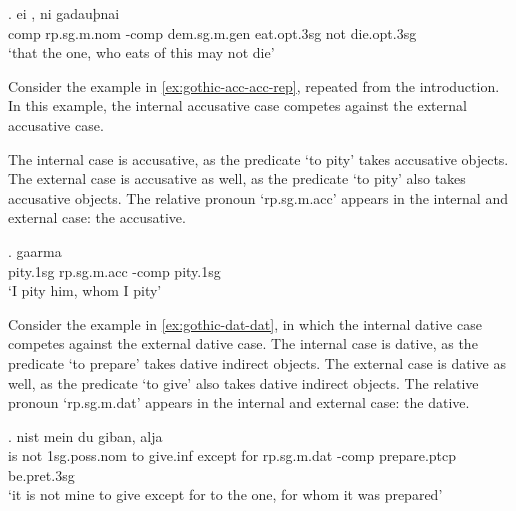 \exg. ei    , ni gadauþnai\\
\ac{comp} \ac{rp}.\ac{sg}.\ac{m}.\ac{nom} -\ac{comp} \ac{dem}.\ac{sg}.\ac{m}.\ac{gen} eat.\ac{opt}.3\ac{sg}\scsub{[nom]} not die.\ac{opt}.3\ac{sg}\scsub{[nom]}\\
`that the one, who eats of this may not die' \label{ex:gothic-nom-nom}

Consider the example in \ref{ex:gothic-acc-acc-rep}, repeated from the introduction. In this example, the internal accusative case competes against the external accusative case.

The internal case is accusative, as the predicate  `to pity' takes accusative objects.
The external case is accusative as well, as the predicate  `to pity' also takes accusative objects.
The relative pronoun  `\ac{rp}.\ac{sg}.\ac{m}.\ac{acc}' appears in the internal and external case: the accusative.

\exg. gaarma   \\
 pity.1\ac{sg}\scsub{[acc]} \ac{rp}.\ac{sg}.\ac{m}.\ac{acc} -\ac{comp} pity.1\ac{sg}\scsub{[acc]}\\
 `I pity him, whom I pity' \label{ex:gothic-acc-acc-rep}

Consider the example in \ref{ex:gothic-dat-dat}, in which the internal dative case competes against the external dative case.
The internal case is dative, as the predicate  `to prepare' takes dative indirect objects.
The external case is dative as well, as the predicate  `to give' also takes dative indirect objects.
The relative pronoun  `\ac{rp}.\ac{sg}.\ac{m}.\ac{dat}' appears in the internal and external case: the dative.

\exg. nist mein du giban, alja    \\
{is not} 1\ac{sg}.\ac{poss}.\ac{nom} to give.\ac{inf}\scsub{[dat]} {except for} \ac{rp}.\ac{sg}.\ac{m}.\ac{dat} -\ac{comp} prepare.\ac{ptcp} be.\ac{pret}.3\ac{sg}\scsub{[dat]}\\
`it is not mine to give except for to the one, for whom it was prepared'\label{ex:gothic-dat-dat}

